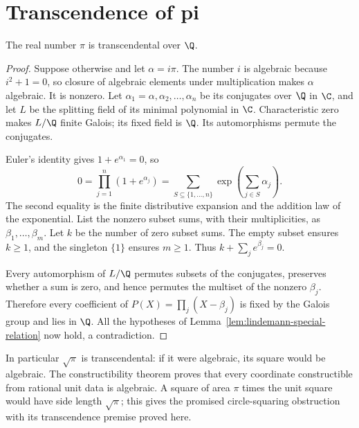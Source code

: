 \section{Transcendence of pi}
\begin{theorem}\label{thm:pi-transcendental}
The real number $\pi$ is transcendental over $\Q$.
\end{theorem}
\begin{proof}
Suppose otherwise and let $\alpha=i\pi$. The number $i$ is
algebraic because $i^2+1=0$, so closure of algebraic elements under
multiplication makes $\alpha$ algebraic. It is nonzero. Let
$\alpha_1=\alpha,\alpha_2,\ldots,\alpha_n$ be its conjugates
over $\Q$ in $\C$, and let $L$ be the splitting field of its
minimal polynomial in $\C$. Characteristic zero makes $L/\Q$
finite Galois; its fixed field is $\Q$. Its automorphisms permute
the conjugates.

Euler's identity gives $1+e^{\alpha_1}=0$, so
\[
 0=\prod_{j=1}^n(1+e^{\alpha_j})
   =\sum_{S\subseteq\{1,\ldots,n\}}
       \exp\!\left(\sum_{j\in S}\alpha_j\right).
\]
The second equality is the finite distributive expansion and the
addition law of the exponential. List the nonzero subset sums,
with their multiplicities, as $\beta_1,\ldots,\beta_m$. Let $k$
be the number of zero subset sums. The empty subset ensures
$k\ge1$, and the singleton $\{1\}$ ensures $m\ge1$. Thus
$k+\sum_je^{\beta_j}=0$.

Every automorphism of $L/\Q$ permutes subsets of the conjugates,
preserves whether a sum is zero, and hence permutes the multiset
of the nonzero $\beta_j$. Therefore every coefficient of
$P(X)=\prod_j(X-\beta_j)$ is fixed by the Galois group and lies
in $\Q$. All the hypotheses of
Lemma~\ref{lem:lindemann-special-relation} now hold, a contradiction.
\end{proof}
In particular $\sqrt\pi$ is transcendental: if it were algebraic,
its square would be algebraic. The constructibility theorem proves
that every coordinate constructible from rational unit data is
algebraic. A square of area $\pi$ times the unit square would have
side length $\sqrt\pi$; this gives the promised circle-squaring
obstruction with its transcendence premise proved here.
